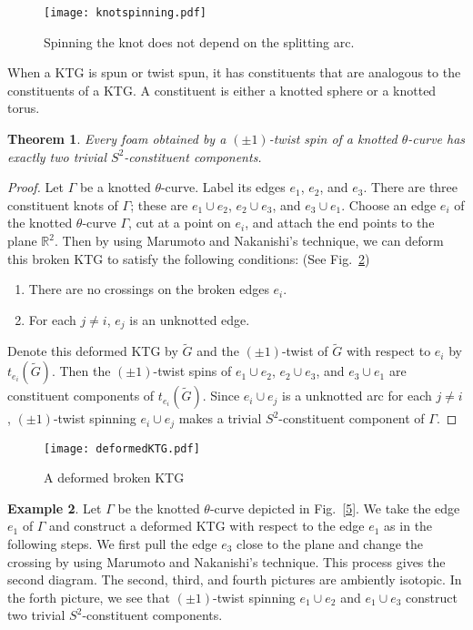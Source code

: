 \documentclass{amsart}
\newtheorem{theorem}{Theorem}[section]
\theoremstyle{definition}
\newtheorem{example}[theorem]{Example}
\theoremstyle{remark}
\numberwithin{equation}{section}
\begin{document}
\begin{figure}[h]
\texttt{[image: knotspinning.pdf]}
\caption{Spinning the knot does not depend on the splitting arc.}
\label{4}
\end{figure}

When a KTG is spun or twist spun, it has constituents that are analogous to the constituents of a KTG. A constituent is either a knotted sphere or a knotted torus.

\begin{theorem}
Every foam obtained by a $(\pm1)$-twist spin of a knotted $\theta$-curve has exactly two trivial $S^{2}$-constituent components.
\end{theorem}

\begin{proof}
Let $\Gamma$ be a knotted $\theta$-curve. Label its edges $e_{1}$, $e_{2}$, and $e_{3}$. There are three constituent knots of $\Gamma$; these are $e_{1} \cup e_{2}$, $e_{2} \cup e_{3}$, and $e_{3} \cup e_{1}$. Choose an edge $e_{i}$ of the knotted $\theta$-curve $\Gamma$, cut at a point on $e_{i}$, and attach the end points to the plane $\mathbb{R}^{2}$. Then by using Marumoto and Nakanishi's technique, we can deform this broken KTG to satisfy the following conditions: (See Fig.~\ref{7})

\begin{enumerate}
\item There are no crossings on the broken edges $e_{i}$.
\item For each $j \neq i$, $e_{j}$ is an unknotted edge.
\end{enumerate}

Denote this deformed KTG by $\widetilde{G}$ and the $(\pm1)$-twist of $\widetilde{G}$ with respect to $e_{i}$ by $t_{e_{i}}(\widetilde{G})$. Then the $(\pm1)$-twist spins of $e_{1} \cup e_{2}$, $e_{2} \cup e_{3}$, and $e_{3} \cup e_{1}$ are constituent components of $t_{e_{i}}(\widetilde{G})$. Since $e_{i} \cup e_{j}$ is a unknotted arc for each $j\neq i$, $(\pm1)$-twist spinning $e_{i} \cup e_{j}$ makes a trivial $S^{2}$-constituent component of $\Gamma$.
\end{proof}

\begin{figure}[h]
\texttt{[image: deformedKTG.pdf]}
\caption{A deformed broken KTG}
\label{7}
\end{figure}

\begin{example}
Let $\Gamma$ be the knotted $\theta$-curve depicted in  Fig.~\ref{5}. We take the edge $e_{1}$ of $\Gamma$ and construct a deformed KTG with respect to the edge $e_{1}$ as in the following steps. We first pull the edge $e_{3}$ close to the plane and change the crossing by using Marumoto and Nakanishi's technique. This process gives the second diagram. The second, third, and fourth pictures are ambiently isotopic. In the forth picture, we see that $(\pm1)$-twist spinning $e_{1} \cup e_{2}$ and $e_{1} \cup e_{3}$ construct two trivial $S^{2}$-constituent components.
\end{example}
\end{document}
